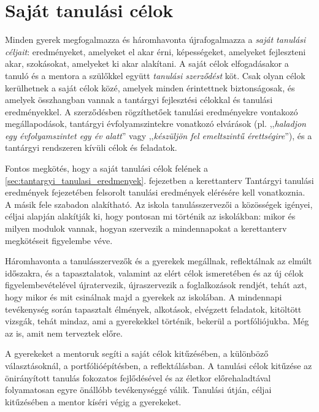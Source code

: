 \section{Saját tanulási célok}
\label{sec:tanulasi_celok}

Minden gyerek megfogalmazza és háromhavonta újrafogalmazza a \emph{saját
      tanulási céljait}: eredményeket, amelyeket el akar érni, képességeket,
amelyeket fejleszteni akar, szokásokat, amelyeket ki akar alakítani. A saját
célok elfogadásakor a tanuló és a mentora a szülőkkel együtt \emph{tanulási
      szerződést} köt. Csak olyan célok kerülhetnek a saját célok közé, amelyek
minden érintettnek biztonságosak, és amelyek összhangban vannak a tantárgyi
fejlesztési célokkal és tanulási eredményekkel. A szerződésben rögzíthetőek
tanulási eredményekre
vontakozó megállapodások,
tantárgyi évfolyamszintekre vonatkozó elvárások (pl. ,,\emph{haladjon egy
      évfolyamszintet egy év alatt}'' vagy ,,\emph{készüljön fel emeltszintű
      érettségire}''), és a tantárgyi rendszeren kívüli célok és
feladatok.

Fontos megkötés, hogy a saját tanulási célok felének a
\ifkerettanterv
      \ref{sec:tantargyi_tanulasi_eredmenyek}. fejezetben
\else
      a kerettanterv Tantárgyi tanulási eredmények fejezetében
\fi
felsorolt tanulási eredmények elérésére kell vonatkoznia. A másik
fele szabadon alakítható. Az iskola tanulásszervezői a közösségek igényei,
céljai
alapján alakítják ki, hogy pontosan mi történik az iskolákban: mikor és milyen
modulok vannak, hogyan szervezik a mindennapokat a kerettanterv megkötéseit
figyelembe véve.

Háromhavonta a tanulásszervezők és a gyerekek megállnak, reflektálnak az elmúlt
időszakra, és a tapasztalatok, valamint az elért célok ismeretében és az új
célok figyelembevételével újratervezik, újraszervezik a foglalkozások rendjét,
tehát azt, hogy mikor és mit csinálnak majd a gyerekek az iskolában.
A mindennapi tevékenység során tapasztalt élmények, alkotások, elvégzett
feladatok, kitöltött vizsgák, tehát mindaz, ami a gyerekekkel történik, bekerül
a portfóliójukba. Még az is, amit nem terveztek előre.

A gyerekeket a mentoruk segíti a saját célok kitűzésében, a különböző
választásoknál, a portfólióépítésben, a reflektálásban. A tanulási célok
kitűzése az önirányított tanulás fokozatos fejlődésével és az életkor
előrehaladtával folyamatosan egyre önállóbb tevékenységgé válik. Tanulási
útján, céljai kitűzésében a mentor kíséri végig a gyerekeket.

